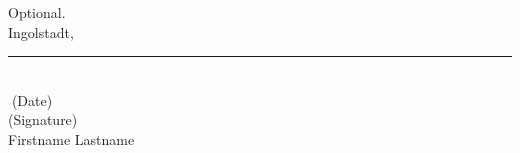 


Optional.\\ 
	
Ingolstadt, \rule{0.3\textwidth}{0.4pt}	\\
\textcolor{white}{.}\qquad\qquad\qquad\qquad\quad \small (Date) \\ [1.3cm]
	
(Signature) \\
Firstname Lastname
